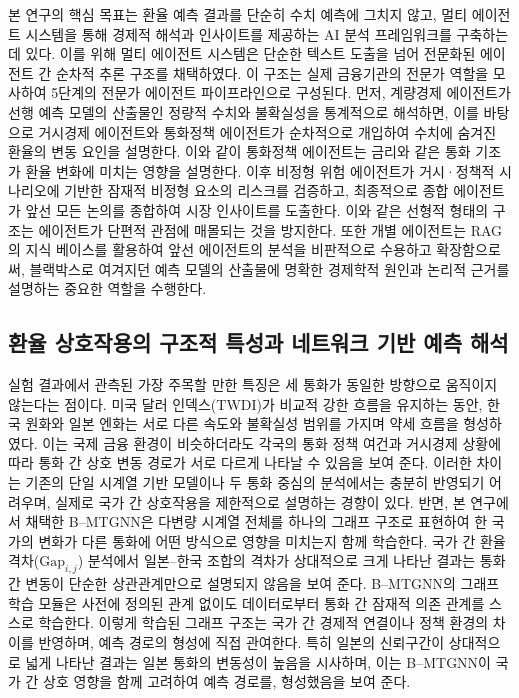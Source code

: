 \titlespacing*{\subsection}{0pt}{1.0em}{0.3em}
\titlespacing*{\paragraph}{0pt}{1.0em}{0.3em}

본 연구의 핵심 목표는 환율 예측 결과를 단순히 수치 예측에 그치지 않고, 멀티 에이전트 시스템을 통해 경제적 해석과 인사이트를 제공하는 AI 분석 프레임워크를 구축하는 데 있다. 이를 위해 멀티 에이전트 시스템은 단순한 텍스트 도출을 넘어 전문화된 에이전트 간 순차적 추론 구조를 채택하였다. 이 구조는 실제 금융기관의 전문가 역할을 모사하여 5단계의 전문가 에이전트 파이프라인으로 구성된다. 먼저, 계량경제 에이전트가 선행 예측 모델의 산출물인 정량적 수치와 불확실성을 통계적으로 해석하면, 이를 바탕으로 거시경제 에이전트와 통화정책 에이전트가 순차적으로 개입하여 수치에 숨겨진 환율의 변동 요인을 설명한다. 이와 같이 통화정책 에이전트는 금리와 같은 통화 기조가 환율 변화에 미치는 영향을 설명한다. 이후 비정형 위험 에이전트가 거시·정책적 시나리오에 기반한 잠재적 비정형 요소의 리스크를 검증하고, 최종적으로 종합 에이전트가 앞선 모든 논의를 종합하여 시장 인사이트를 도출한다. 이와 같은 선형적 형태의 구조는 에이전트가 단편적 관점에 매몰되는 것을 방지한다. 또한 개별 에이전트는 RAG의 지식 베이스를 활용하여 앞선 에이전트의 분석을 비판적으로 수용하고 확장함으로써, 블랙박스로 여겨지던 예측 모델의 산출물에 명확한 경제학적 원인과 논리적 근거를 설명하는 중요한 역할을 수행한다.

\subsection{환율 상호작용의 구조적 특성과 네트워크 기반 예측 해석}
실험 결과에서 관측된 가장 주목할 만한 특징은 세 통화가 동일한 방향으로 움직이지 않는다는 점이다. 미국 달러 인덱스(TWDI)가 비교적 강한 흐름을 유지하는 동안, 한국 원화와 일본 엔화는 서로 다른 속도와 불확실성 범위를 가지며 약세 흐름을 형성하였다. 이는 국제 금융 환경이 비슷하더라도 각국의 통화 정책 여건과 거시경제 상황에 따라 통화 간 상호 변동 경로가 서로 다르게 나타날 수 있음을 보여 준다. 이러한 차이는 기존의 단일 시계열 기반 모델이나 두 통화 중심의 분석에서는 충분히 반영되기 어려우며, 실제로 국가 간 상호작용을 제한적으로 설명하는 경향이 있다. 
반면, 본 연구에서 채택한 B--MTGNN은 다변량 시계열 전체를 하나의 그래프 구조로 표현하여 한 국가의 변화가 다른 통화에 어떤 방식으로 영향을 미치는지 함께 학습한다. 국가 간 환율 격차($\mathrm{Gap}_{i,j}$) 분석에서 일본--한국 조합의 격차가 상대적으로 크게 나타난 결과는 통화 간 변동이 단순한 상관관계만으로 설명되지 않음을 보여 준다. B--MTGNN의 그래프 학습 모듈은 사전에 정의된 관계 없이도 데이터로부터 통화 간 잠재적 의존 관계를 스스로 학습한다. 이렇게 학습된 그래프 구조는 국가 간 경제적 연결이나 정책 환경의 차이를 반영하며, 예측 경로의 형성에 직접 관여한다. 특히 일본의 신뢰구간이 상대적으로 넓게 나타난 결과는 일본 통화의 변동성이 높음을 시사하며, 이는 B--MTGNN이 국가 간 상호 영향을 함께 고려하여 예측 경로를, 형성했음을 보여 준다.

